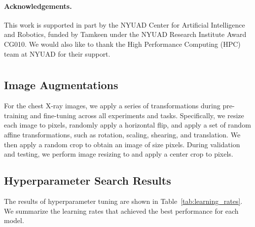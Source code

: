 \documentclass[pmlr]{jmlr}
\begin{document}
\paragraph{Acknowledgements.} This work is supported in part by the NYUAD Center for Artificial Intelligence and Robotics, funded by Tamkeen under the NYUAD Research Institute Award CG010. We would also like to thank the High Performance Computing (HPC) team at NYUAD for their support.




\newpage
 \appendix
 \section{}
 \label{appendix-a}
 \setcounter{table}{0}
\renewcommand{\thetable}{A\arabic{table}}

 \setcounter{figure}{0}
\renewcommand{\thefigure}{A\arabic{figure}}
 
\subsection{Image Augmentations}
\label{image-aug}
For the chest X-ray images, we apply a series of transformations during pre-training and fine-tuning across all experiments and tasks. Specifically, we resize each image to  pixels, randomly apply a horizontal flip, and apply a set of random affine transformations, such as rotation, scaling, shearing, and translation. We then apply a random crop to obtain an image of size   pixels. During validation and testing, we perform image resizing to  and apply a center crop to  pixels. 

 
\subsection{Hyperparameter Search Results}
\label{hyperparameter} 
 The results of hyperparameter tuning are shown in Table~\ref{tab:learning_rates}. We summarize the learning rates that achieved the best performance for each model. 
 
\end{document}
